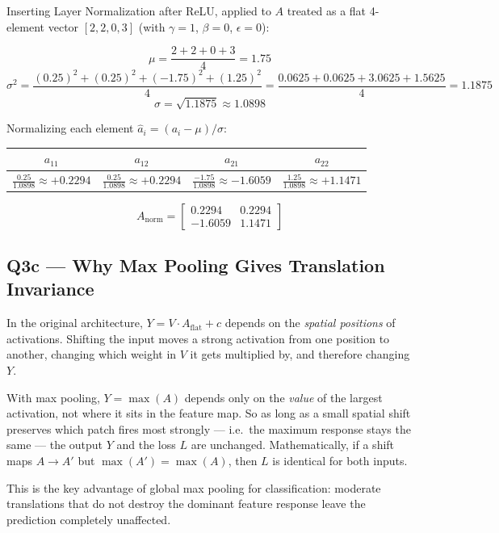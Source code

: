 \documentclass[11pt,a4paper]{article}
\begin{document}
Inserting Layer Normalization after ReLU, applied to $A$ treated as a flat
4-element vector $[2, 2, 0, 3]$ (with $\gamma=1$, $\beta=0$, $\epsilon=0$):

\[
\mu = \frac{2+2+0+3}{4} = 1.75
\]
\[
\sigma^2 = \frac{(0.25)^2 + (0.25)^2 + (-1.75)^2 + (1.25)^2}{4}
         = \frac{0.0625 + 0.0625 + 3.0625 + 1.5625}{4} = 1.1875
\]
\[
\sigma = \sqrt{1.1875} \approx 1.0898
\]

Normalizing each element $\hat{a}_i = (a_i - \mu)/\sigma$:

\begin{center}
\begin{tabular}{cccc}
\toprule
$a_{11}$ & $a_{12}$ & $a_{21}$ & $a_{22}$ \\
\midrule
$\frac{0.25}{1.0898} \approx +0.2294$ &
$\frac{0.25}{1.0898} \approx +0.2294$ &
$\frac{-1.75}{1.0898} \approx -1.6059$ &
$\frac{1.25}{1.0898} \approx +1.1471$ \\
\bottomrule
\end{tabular}
\end{center}

\[
A_{\text{norm}} = \begin{bmatrix} 0.2294 & 0.2294 \\ -1.6059 & 1.1471 \end{bmatrix}
\]

\subsection{Q3c --- Why Max Pooling Gives Translation Invariance}

In the original architecture, $Y = V \cdot A_{\text{flat}} + c$ depends on
the \emph{spatial positions} of activations. Shifting the input moves a strong
activation from one position to another, changing which weight in $V$ it gets
multiplied by, and therefore changing $Y$.

With max pooling, $Y = \max(A)$ depends only on the \emph{value} of the
largest activation, not where it sits in the feature map. So as long as a
small spatial shift preserves which patch fires most strongly --- i.e.\ the
maximum response stays the same --- the output $Y$ and the loss $L$ are
unchanged. Mathematically, if a shift maps $A \to A'$ but
$\max(A') = \max(A)$, then $L$ is identical for both inputs.

This is the key advantage of global max pooling for classification: moderate
translations that do not destroy the dominant feature response leave the
prediction completely unaffected.
\end{document}
